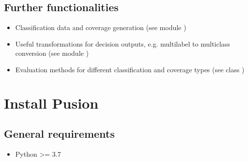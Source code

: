 \documentclass[letterpaper,10pt,english]{sphinxmanual}
\begin{document}
\section{Further functionalities}
\label{\detokenize{overview:further-functionalities}}\begin{itemize}
\item {} 
\sphinxAtStartPar
Classification data and coverage generation (see module {\hyperref[\detokenize{pusion.util.generator:generator-cref}]{}})

\item {} 
\sphinxAtStartPar
Useful transformations for decision outputs, e.g. multilabel to multiclass conversion
(see module {\hyperref[\detokenize{pusion.util.transformer:transformer-cref}]{}})

\item {} 
\sphinxAtStartPar
Evaluation methods for different classification and coverage types (see class {\hyperref[\detokenize{pusion.evaluation.evaluation:eval-cref}]{}})

\end{itemize}


\chapter{Install Pusion}
\label{\detokenize{install:install-pusion}}\label{\detokenize{install::doc}}

\section{General requirements}
\label{\detokenize{install:general-requirements}}\begin{itemize}
\item {} 
\sphinxAtStartPar
Python \textgreater{}= 3.7

\end{itemize}
\end{document}
